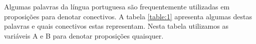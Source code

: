 
Algumas palavras da l\'ingua portuguesa s\~ao frequentemente utilizadas em proposi\c{c}\~oes para denotar conectivos. A tabela \ref{table:1}
apresenta algumas destas palavras e quais conectivos estas representam. Nesta tabela utilizamos as vari\'aveis A e B para denotar proposi\c{c}\~oes
quaisquer.

